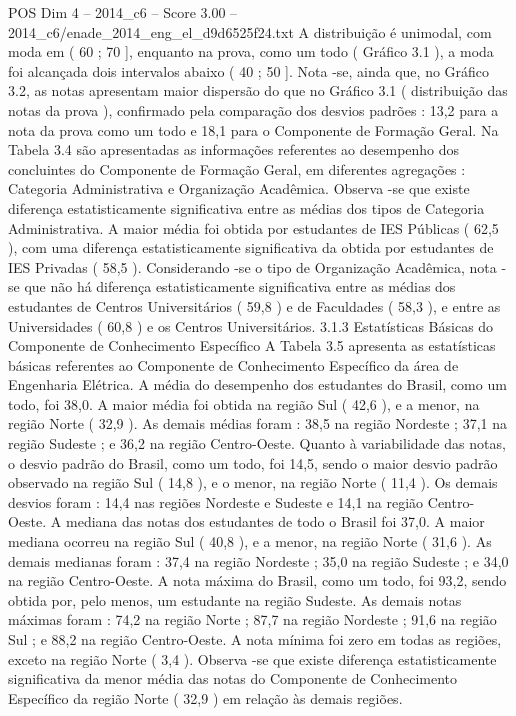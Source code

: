 \begin{textsample}{POS Dim 4 – 2014\_c6 – Score 3.00 – 2014\_c6/enade\_2014\_eng\_el\_d9d6525f24.txt}
A distribuição é unimodal, com moda em ( 60 ; 70 ], enquanto na prova, como um todo ( Gráfico 3.1 ), a moda foi alcançada dois intervalos abaixo ( 40 ; 50 ].
Nota -se, ainda que, no Gráfico 3.2, as notas apresentam maior dispersão do que no Gráfico 3.1 ( distribuição das notas da prova ), confirmado pela comparação dos desvios padrões : 13,2 para a nota da prova como um todo e 18,1 para o Componente de Formação Geral.
Na Tabela 3.4 são apresentadas as informações referentes ao desempenho dos concluintes do Componente de Formação Geral, em diferentes agregações : Categoria Administrativa e Organização Acadêmica.
Observa -se que existe diferença estatisticamente significativa entre as médias dos tipos de Categoria Administrativa.
A maior média foi obtida por estudantes de IES Públicas ( 62,5 ), com uma diferença estatisticamente significativa da obtida por estudantes de IES Privadas ( 58,5 ).
Considerando -se o tipo de Organização Acadêmica, nota -se que não há diferença estatisticamente significativa entre as médias dos estudantes de Centros Universitários ( 59,8 ) e de Faculdades ( 58,3 ), e entre as Universidades ( 60,8 ) e os Centros Universitários. 3.1.3 Estatísticas Básicas do Componente de Conhecimento Específico A Tabela 3.5 apresenta as estatísticas básicas referentes ao Componente de Conhecimento Específico da área de Engenharia Elétrica.
A média do desempenho dos estudantes do Brasil, como um todo, foi 38,0.
A maior média foi obtida na região Sul ( 42,6 ), e a menor, na região Norte ( 32,9 ).
As demais médias foram : 38,5 na região Nordeste ; 37,1 na região Sudeste ; e 36,2 na região Centro-Oeste.
Quanto à variabilidade das notas, o desvio padrão do Brasil, como um todo, foi 14,5, sendo o maior desvio padrão observado na região Sul ( 14,8 ), e o menor, na região Norte ( 11,4 ).
Os demais desvios foram : 14,4 nas regiões Nordeste e Sudeste e 14,1 na região Centro-Oeste.
A mediana das notas dos estudantes de todo o Brasil foi 37,0.
A maior mediana ocorreu na região Sul ( 40,8 ), e a menor, na região Norte ( 31,6 ).
As demais medianas foram : 37,4 na região Nordeste ; 35,0 na região Sudeste ; e 34,0 na região Centro-Oeste.
A nota máxima do Brasil, como um todo, foi 93,2, sendo obtida por, pelo menos, um estudante na região Sudeste.
As demais notas máximas foram : 74,2 na região Norte ; 87,7 na região Nordeste ; 91,6 na região Sul ; e 88,2 na região Centro-Oeste.
A nota mínima foi zero em todas as regiões, exceto na região Norte ( 3,4 ).
Observa -se que existe diferença estatisticamente significativa da menor média das notas do Componente de Conhecimento Específico da região Norte ( 32,9 ) em relação às demais regiões.

\end{textsample}
